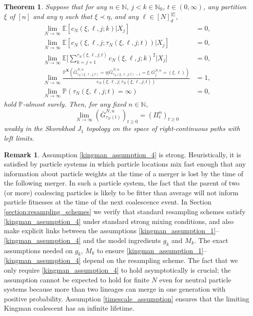 \documentclass[a4paper,11pt]{article}
\newtheorem{thm}{Theorem}
\theoremstyle{definition}
\newtheorem{rem}{Remark}
\newcommand{\bbP}{\mathbb{P}}
\newcommand{\bbN}{\mathbb{N}}
\newcommand{\bbE}{\mathbb{E}}
\newcommand{\bfX}{\mathbf{X}}
\begin{document}
\begin{thm}\label{thm:main_result}
Suppose that for any $n \in \bbN$, $j < k \in \bbN_0$, $t \in ( 0, \infty )$, any partition $\xi$ of $[n]$ and any $\eta$ such that $\xi \prec \eta$, and any $\ell \in [ N ]_d^{ | \xi | }$,
\begin{align}
\lim_{ N \to \infty } \bbE[ c_N( \xi, \ell, j; k ) | X_j ] &= 0, \label{kingman_assumption_1} \\
\lim_{ N \to \infty } \bbE[ c_N( \xi, \ell, j; \tau_N( \xi, \ell, j; t ) ) | X_j ] &= 0, \label{kingman_assumption_2} \\
\lim_{ N \to \infty } \bbE\Bigg[ \sum_{ k = j + 1 }^{ \tau_N( \xi, \ell, j; t ) } c_N( \xi, \ell, j; k )^2 \Big| X_j \Bigg] &= 0, \label{kingman_assumption_3} \\
\lim_{ N \to \infty } \frac{ \bbP^{ \bfX }( \bar{ G }_{ \tau_N( \xi, \ell, j; t ) }^{ N, n } = \eta | \bar{ G }_{ \tau_N( \xi, \ell, j; t ) - 1 }^{ N, n } = \xi, G_j^{ N, n } = ( \xi, \ell ) ) }{ c_N( \xi, \ell, j; \tau_N( \xi, \ell, j; t ) ) } &= 1, \label{kingman_assumption_4}\\
\lim_{N \to \infty} \bbP( \tau_N( \xi, \ell, j; t ) = \infty ) &= 0, \label{timescale_assumption}
\end{align}
hold $\bbP$-almost surely.
Then, for any fixed $n \in \bbN$,
\begin{equation*}
\lim_{ N \to \infty } ( \bar{ G }_{ \tau_N( t ) }^{ N, n } )_{ t \geq 0 } = ( \Pi_t^n )_{ t \geq 0 }
\end{equation*}
weakly in the Skorokhod $J_1$ topology on the space of right-continuous paths with left limits.
\end{thm}

\begin{rem}
Assumption \eqref{kingman_assumption_4} is strong.
Heuristically, it is satisfied by particle systems in which particle locations mix fast enough that any information about particle weights at the time of a merger is lost by the time of the following merger.
In such a particle system, the fact that the parent of two (or more) coalescing particles is likely to be fitter than average will not inform particle fitnesses at the time of the next coalescence event.
In Section \ref{section:resampling_schemes} we verify that standard resampling schemes satisfy \eqref{kingman_assumption_4} under standard strong mixing conditions, and also make explicit links between the assumptions \eqref{kingman_assumption_1}--\eqref{kingman_assumption_4} and the model ingredients $g_k$ and $M_k$.
The exact assumptions needed on $g_k$, $M_k$ to ensure \eqref{kingman_assumption_1}--\eqref{kingman_assumption_4} depend on the resampling scheme.
The fact that we only require \eqref{kingman_assumption_4} to hold asymptotically is crucial; the assumption cannot be expected to hold for finite $N$ even for neutral particle systems because more than two lineages can merge in one generation with positive probability.
Assumption \eqref{timescale_assumption} ensures that the limiting Kingman coalescent has an infinite lifetime.
\end{rem}
\end{document}
